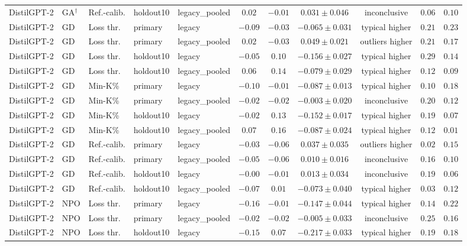 \begin{table}[t]
\begin{tabular*}{\textwidth}{@{\extracolsep{\fill}}lllllcccccc@{}}
DistilGPT-2 & GA$^{\dagger}$ & Ref.-calib. & holdout10 & legacy\_pooled & $0.02$ & $-0.01$ & $0.031 \pm 0.046$ & inconclusive & $0.06$ & $0.10$ \\
DistilGPT-2 & GD & Loss thr. & primary & legacy & $-0.09$ & $-0.03$ & $-0.065 \pm 0.031$ & typical higher & $0.21$ & $0.23$ \\
DistilGPT-2 & GD & Loss thr. & primary & legacy\_pooled & $0.02$ & $-0.03$ & $0.049 \pm 0.021$ & outliers higher & $0.21$ & $0.17$ \\
DistilGPT-2 & GD & Loss thr. & holdout10 & legacy & $-0.05$ & $0.10$ & $-0.156 \pm 0.027$ & typical higher & $0.29$ & $0.14$ \\
DistilGPT-2 & GD & Loss thr. & holdout10 & legacy\_pooled & $0.06$ & $0.14$ & $-0.079 \pm 0.029$ & typical higher & $0.12$ & $0.09$ \\
DistilGPT-2 & GD & Min-K\% & primary & legacy & $-0.10$ & $-0.01$ & $-0.087 \pm 0.013$ & typical higher & $0.10$ & $0.18$ \\
DistilGPT-2 & GD & Min-K\% & primary & legacy\_pooled & $-0.02$ & $-0.02$ & $-0.003 \pm 0.020$ & inconclusive & $0.20$ & $0.12$ \\
DistilGPT-2 & GD & Min-K\% & holdout10 & legacy & $-0.02$ & $0.13$ & $-0.152 \pm 0.017$ & typical higher & $0.19$ & $0.07$ \\
DistilGPT-2 & GD & Min-K\% & holdout10 & legacy\_pooled & $0.07$ & $0.16$ & $-0.087 \pm 0.024$ & typical higher & $0.12$ & $0.01$ \\
DistilGPT-2 & GD & Ref.-calib. & primary & legacy & $-0.03$ & $-0.06$ & $0.037 \pm 0.035$ & outliers higher & $0.02$ & $0.15$ \\
DistilGPT-2 & GD & Ref.-calib. & primary & legacy\_pooled & $-0.05$ & $-0.06$ & $0.010 \pm 0.016$ & inconclusive & $0.16$ & $0.10$ \\
DistilGPT-2 & GD & Ref.-calib. & holdout10 & legacy & $-0.00$ & $-0.01$ & $0.013 \pm 0.034$ & inconclusive & $0.19$ & $0.06$ \\
DistilGPT-2 & GD & Ref.-calib. & holdout10 & legacy\_pooled & $-0.07$ & $0.01$ & $-0.073 \pm 0.040$ & typical higher & $0.03$ & $0.12$ \\
DistilGPT-2 & NPO & Loss thr. & primary & legacy & $-0.16$ & $-0.01$ & $-0.147 \pm 0.044$ & typical higher & $0.14$ & $0.22$ \\
DistilGPT-2 & NPO & Loss thr. & primary & legacy\_pooled & $-0.02$ & $-0.02$ & $-0.005 \pm 0.033$ & inconclusive & $0.25$ & $0.16$ \\
DistilGPT-2 & NPO & Loss thr. & holdout10 & legacy & $-0.15$ & $0.07$ & $-0.217 \pm 0.033$ & typical higher & $0.19$ & $0.18$ \\

\end{tabular*}
\end{table}

